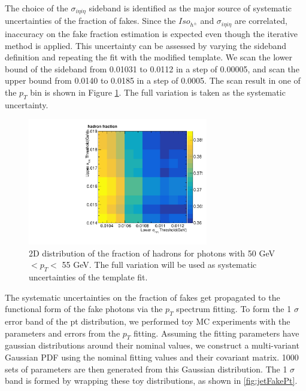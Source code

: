 \documentclass[thesis.tex]{subfiles}
\renewcommand\_{\textunderscore\allowbreak}
\begin{document}
The choice of the $\sigma_{i\eta i\eta}$ sideband is identified as the major source of systematic uncertainties of the fraction of fakes. Since the $Iso_{h^\pm}$ and $\sigma_{i\eta i\eta}$ are correlated, inaccuracy on the fake fraction estimation is expected even though the iterative method is applied. This uncertainty can be assessed by varying the sideband definition and repeating the fit with the modified template. We scan the lower bound of the sideband from 0.01031 to 0.0112 in a step of 0.00005, and scan the upper bound from 0.0140 to 0.0185 in a step of 0.0005. The scan result in one of the $p_T$ bin is shown in Figure \ref{fig:jetfakeSys}. The full variation is taken as the systematic uncertainty. 

\begin{figure}[!hbt]
  \centering
    \includegraphics[width=0.7\textwidth]{Figures/can2D-50-55_ChIso-DoubleEG-ReMiniAOD.pdf}
  \caption{2D distribution of the fraction of hadrons for photons with 50 GeV $< p_T <$ 55 GeV. The full variation will be used as systematic uncertainties of the template fit.}
    \label{fig:jetfakeSys}
\end{figure}


The systematic uncertainties on the fraction of fakes get propagated to the functional form of the fake photons via the $p_T$ spectrum fitting. To form the 1 $\sigma$ error band of the pt distribution, we performed toy MC experiments with the parameters and errors from the $p_T$ fitting. Assuming the fitting parameters have gaussian distributions around their nominal values, we construct a multi-variant Gaussian PDF using the nominal fitting values and their covariant matrix. 1000 sets of parameters are then generated from this Gaussian distribution. The 1 $\sigma$ band is formed by wrapping these toy distributions, as shown  in \ref{fig:jetFakePt}. 
\end{document}
